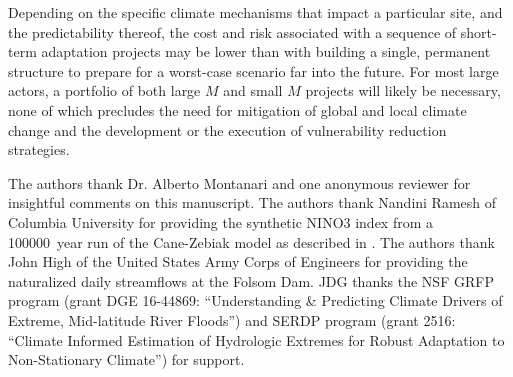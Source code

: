 \documentclass[
  draft,
  linenumbers
]{agujournal2019}
\begin{document}
Depending on the specific climate mechanisms that impact a particular site, and the predictability thereof, the cost and risk associated with a sequence of short-term adaptation projects may be lower than with building a single, permanent structure to prepare for a worst-case scenario far into the future.
For most large actors, a portfolio of both large $M$ and small $M$ projects will likely be necessary, none of which precludes the need for mitigation of global and local climate change and the development or the execution of vulnerability reduction strategies.


\acknowledgments

The authors thank Dr. Alberto Montanari and one anonymous reviewer for insightful comments on this manuscript.
The authors thank Nandini Ramesh of Columbia University for providing the synthetic NINO3 index from a \SI{100000}{year} run of the Cane-Zebiak model as described in \citet{Ramesh:2016hf}.
The authors thank John High of the United States Army Corps of Engineers for providing the naturalized daily streamflows at the Folsom Dam.
JDG thanks the NSF GRFP program (grant DGE 16-44869: ``Understanding \& Predicting Climate Drivers of Extreme, Mid-latitude River Floods'') and SERDP program (grant 2516: ``Climate Informed Estimation of Hydrologic Extremes for Robust Adaptation to Non-Stationary Climate'') for support.

\end{document}
